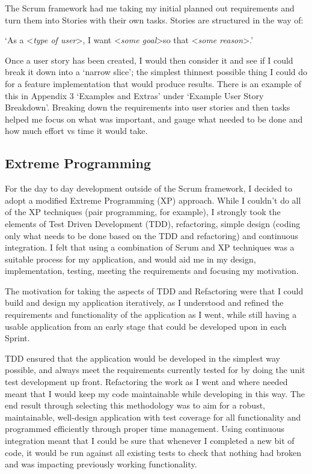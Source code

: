 The Scrum framework had me taking my initial planned out requirements and turn them into Stories with their own tasks. Stories are structured in the way of:
\newline

`As a \textless \textit{type of user}\textgreater, I want \textless \textit{some goal}\textgreater so that \textless \textit{some reason}\textgreater.'\cite{userstories}
\newline

Once a user story has been created, I would then consider it and see if I could break it down into a `narrow slice'; the simplest thinnest possible thing I could do for a feature implementation that would produce results. There is an example of this in Appendix 3 `Examples and Extras' under `Example User Story Breakdown'. Breaking down the requirements into user stories and then tasks helped me focus on what was important, and gauge what needed to be done and how much effort vs time it would take.

\subsection{Extreme Programming}
For the day to day development outside of the Scrum framework, I decided to adopt a modified Extreme Programming (XP) approach\cite{xp}. While I couldn't do all of the XP techniques (pair programming, for example), I strongly took the elements of Test Driven Development (TDD), refactoring, simple design (coding only what needs to be done based on the TDD and refactoring) and continuous integration. I felt that using a combination of Scrum and XP techniques was a suitable process for my application, and would aid me in my design, implementation, testing, meeting the requirements and focusing my motivation.

The motivation for taking the aspects of TDD and Refactoring were that I could build and design my application iteratively, as I understood and refined the requirements and functionality of the application as I went, while still having a usable application from an early stage that could be developed upon in each Sprint.

TDD ensured that the application would be developed in the simplest way possible, and always meet the requirements currently tested for by doing the unit test development up front. Refactoring the work as I went and where needed meant that I would keep my code maintainable while developing in this way. The end result through selecting this methodology was to aim for a robust, maintainable, well-design application with test coverage for all functionality and programmed efficiently through proper time management. Using continuous integration meant that I could be sure that whenever I completed a new bit of code, it would be run against all existing tests to check that nothing had broken and was impacting previously working functionality.

